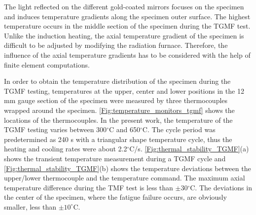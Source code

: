 \documentclass[preprint,5p,twocolumn,10pt,sort&compress]{elsarticle}
\begin{document}
The light reflected on the different gold-coated mirrors focuses on the specimen and induces temperature gradients along the specimen outer surface. The highest temperature occurs in the middle section of the specimen during the TGMF test.
Unlike the induction heating, the axial temperature gradient of the specimen is difficult to be adjusted by modifying the radiation furnace.
Therefore, the influence of the axial temperature gradients has to be considered with the help of finite element computations.

In order to obtain the temperature distribution of the specimen during the TGMF testing, temperatures at the upper, center and lower positions in the 12 mm gauge section of the specimen were measured by three thermocouples wrapped around the specimen. \autoref{Fig:temperature_monitors_tgmf} shows the locations of the thermocouples. In the present work, the temperature of the TGMF testing varies between 300$^\circ$C and 650$^\circ$C. The cycle period was predetermined as 240 s with a triangular shape temperature cycle, thus the heating and cooling rates were about 2.2$^\circ$C/s.
\autoref{Fig:thermal_stability_TGMF}(a) shows the transient temperature measurement during a TGMF cycle and \autoref{Fig:thermal_stability_TGMF}(b) shows the temperature deviations between the upper/lower thermocouple and the temperature command.
The maximum axial temperature difference during the TMF test is less than $\pm30$$^\circ$C. The deviations in the center of the specimen, where the fatigue failure occurs, are obviously smaller, less than $\pm 10^\circ$C. 
\end{document}
